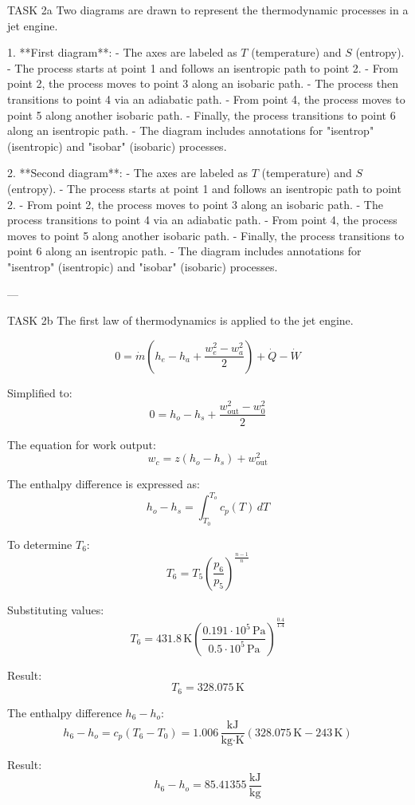 TASK 2a  
Two diagrams are drawn to represent the thermodynamic processes in a jet engine.  

1. **First diagram**:  
   - The axes are labeled as \( T \) (temperature) and \( S \) (entropy).  
   - The process starts at point 1 and follows an isentropic path to point 2.  
   - From point 2, the process moves to point 3 along an isobaric path.  
   - The process then transitions to point 4 via an adiabatic path.  
   - From point 4, the process moves to point 5 along another isobaric path.  
   - Finally, the process transitions to point 6 along an isentropic path.  
   - The diagram includes annotations for "isentrop" (isentropic) and "isobar" (isobaric) processes.  

2. **Second diagram**:  
   - The axes are labeled as \( T \) (temperature) and \( S \) (entropy).  
   - The process starts at point 1 and follows an isentropic path to point 2.  
   - From point 2, the process moves to point 3 along an isobaric path.  
   - The process transitions to point 4 via an adiabatic path.  
   - From point 4, the process moves to point 5 along another isobaric path.  
   - Finally, the process transitions to point 6 along an isentropic path.  
   - The diagram includes annotations for "isentrop" (isentropic) and "isobar" (isobaric) processes.  

---

TASK 2b  
The first law of thermodynamics is applied to the jet engine.  

\[
0 = \dot{m} \left( h_e - h_a + \frac{w_e^2 - w_a^2}{2} \right) + \dot{Q} - \dot{W}
\]

Simplified to:  
\[
0 = h_o - h_s + \frac{w_{\text{out}}^2 - w_0^2}{2}
\]

The equation for work output:  
\[
w_c = z \left( h_o - h_s \right) + w_{\text{out}}^2
\]

The enthalpy difference is expressed as:  
\[
h_o - h_s = \int_{T_0}^{T_o} c_p(T) \, dT
\]

To determine \( T_6 \):  
\[
T_6 = T_5 \left( \frac{p_6}{p_5} \right)^{\frac{n-1}{n}}
\]

Substituting values:  
\[
T_6 = 431.8 \, \text{K} \left( \frac{0.191 \cdot 10^5 \, \text{Pa}}{0.5 \cdot 10^5 \, \text{Pa}} \right)^{\frac{0.4}{1.4}}
\]

Result:  
\[
T_6 = 328.075 \, \text{K}
\]

The enthalpy difference \( h_6 - h_o \):  
\[
h_6 - h_o = c_p \left( T_6 - T_0 \right) = 1.006 \, \frac{\text{kJ}}{\text{kg·K}} \left( 328.075 \, \text{K} - 243 \, \text{K} \right)
\]

Result:  
\[
h_6 - h_o = 85.41355 \, \frac{\text{kJ}}{\text{kg}}
\]